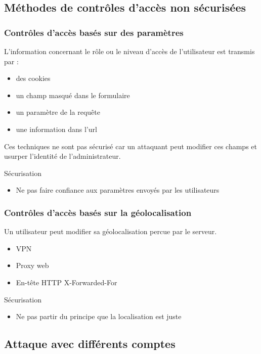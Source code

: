 \documentclass{beamer}
\begin{document}
\subsection{Méthodes de contrôles d'accès non sécurisées}

\begin{frame}
  \frametitle{Contrôles d'accès basés sur des paramètres}
  L'information concernant le rôle ou le niveau d'accès de l'utilisateur est transmis par :
  \begin{itemize}
    \item des cookies
    \item un champ masqué dans le formulaire
    \item un paramètre de la requête
    \item une information dans l'url
  \end{itemize}
  Ces techniques ne sont pas sécurisé car un attaquant peut modifier ces champs et usurper l'identité de l'administrateur.
  \begin{exampleblock}{Sécurisation}
    \begin{itemize}
      \item Ne pas faire confiance aux paramètres envoyés par les utilisateurs
    \end{itemize}
  \end{exampleblock}
\end{frame}


\begin{frame}
  \frametitle{Contrôles d'accès basés sur la géolocalisation}
  Un utilisateur peut modifier sa géolocalisation percue par le serveur.
  \begin{itemize}
    \item VPN
    \item Proxy web
    \item En-tête HTTP X-Forwarded-For
  \end{itemize}
  \begin{exampleblock}{Sécurisation}
    \begin{itemize}
      \item Ne pas partir du principe que la localisation est juste
    \end{itemize}
  \end{exampleblock}
\end{frame}

\subsection{Attaque avec différents comptes}
\end{document}
